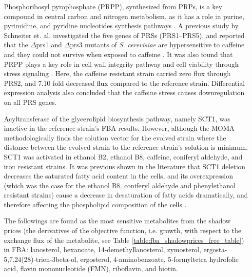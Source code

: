 Phosphoribosyl pyrophosphate (PRPP), synthesized from PRPs, is a key compound in central carbon and nitrogen metabolism, as it has a role in purine, pyrimidine, and pyridine nucleotides synthesis pathways \cite{jimenez2008phosphoribosyl}. A previous study by Schneiter et. al. investigated the five genes of PRSs (PRS1–PRS5), and reported that the $\Delta$prs1 and $\Delta$prs3 mutants of \emph{S. cerevisiae} are hypersensitive to caffeine and they could not survive when exposed to caffeine \cite{schneiter2000importance}. It was also found that PRPP plays a key role in cell wall integrity pathway and cell viability through stress signaling \cite{ugbogu2013contribution}. Here, the caffeine resistant strain carried zero flux through PRS2, and 7.10 fold decreased flux compared to the reference strain. Differential expression analysis also concluded that the caffeine stress causes downregulation on all PRS genes.

Acyltransferase of the glycerolipid biosynthesis pathway, namely SCT1, was inactive in the reference strain's FBA results. However, although the MOMA methodologically finds the solution vector for the evolved strain where the distance between the evolved strain to the reference strain's solution is minimum, SCT1 was activated in ethanol B2, ethanol B8, caffeine, coniferyl aldehyde, and iron resistant strains. It was previous shown in the literature that SCT1 deletion decreases the saturated fatty acid content in the cells, and its overexpression (which was the case for the ethanol B8, coniferyl aldehyde and phenylethanol resistant strains) cause a decrease in desaturation of fatty acids dramatically, and therefore affecting the phospholipid composition of the cells \cite{de2012yeast}.

The followings are found as the most sensitive metabolites from the shadow prices (the derivatives of the objective function, i.e. growth, with respect to the exchange flux of the metabolite, see Table \ref{table:fba_shadowprices_free_table}) in FBA: lanosterol, hexanoate, 14-demethyllanosterol, zymosterol, ergosta-5,7,24(28)-trien-3beta-ol, ergosterol, 4-aminobenzoate, 5-formyltetra hydrofolic acid, flavin mononucleotide (FMN), riboflavin, and biotin.

